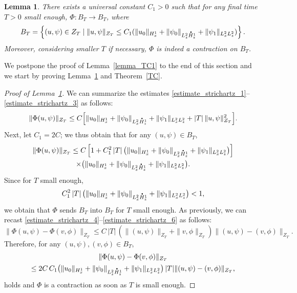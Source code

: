 \documentclass[JEP,XML,SOM,NoEqCountersInSection,NoFloatCountersInSection,Unicode,published]{cedram}
\let\sep\mid
\newtheorem{lemma}{Lemma}[section]
\theoremstyle{definition}
\newcommand*{\overbigdot}[1]{%
\accentset{\mbox{\large\bfseries .}}{#1}}
\newenvironment{ProofOf}[1]{\begin{proof}[Proof of #1]}{\end{proof}}
\begin{document}
\begin{lemma}\label{lemma_TC2}
There exists a universal constant $C_{1}>0$ such that for any final time $T>0$ small enough, $\Phi:B_{T}\to B_{T}$, where
\[
B_{T}=\left\{(u,\psi)\in Z_{T}\sep \|u,\psi\|_{Z_{T}}\leq C_{1}(\|u_{0}\|_{H_{x}^{1}}+\|\psi_{0}\|_{L_{z}^{2}\overbigdot{H}_{z}^{1}}+\|\psi_{1}\|_{L_{x}^{2}L_{z}^{2}})\right\}.
\]
Moreover, considering smaller $T$ if necessary, $\Phi$ is indeed a contraction on $B_{T}$.
\end{lemma}

We postpone the proof of Lemma~\ref{lemma_TC1} to the end of this section and we start by proving Lemma~\ref{lemma_TC2} and Theorem~\ref{TC}.

\begin{ProofOf}{Lemma~\ref{lemma_TC2}}
We can summarize the estimates \eqref{estimate_strichartz_1}--\eqref{estimate_strichartz_3} as follows:
\[
\|\Phi(u,\psi)\|_{Z_{T}}\leq C\Bigl[\|u_{0}\|_{H_{x}^{1}}+\|\psi_{0}\|_{L_{x}^{2}\overbigdot{H}_{z}^{1}}+\|\psi_{1}\|_{L_{x}^{2}L_{z}^{2}}+|T|\,\|u,\psi\|_{Z_{T}}^{2}\Bigr].
\]
Next, let $C_{1}=2C$; we thus obtain that for any $(u,\psi)\in B_{T}$,
\begin{multline*}
\|\Phi(u,\psi)\|_{Z_{T}}\leq C\left[1+C_{1}^{2}\,|T|\, \bigl(\|u_{0}\|_{H_{x}^{1}}+\|\psi_{0}\|_{L_{x}^{2}\overbigdot{H}_{z}^{1}}+\|\psi_{1}\|_{L_{x}^{2}L_{z}^{2}} \bigr)\right]\\
\times\bigl(\|u_{0}\|_{H_{x}^{1}}+\|\psi_{0}\|_{L_{x}^{2}\overbigdot{H}_{z}^{1}}+\|\psi_{1}\|_{L_{x}^{2}L_{z}^{2}}\bigr).
\end{multline*}
Since for $T$ small enough,
\[
C_{1}^{2}\,|T|\, \bigl(\|u_{0}\|_{H_{x}^{1}}+\|\psi_{0}\|_{L_{x}^{2}\overbigdot{H}_{z}^{1}}+\|\psi_{1}\|_{L_{x}^{2}L_{z}^{2}} \bigr)<1,
\]
we obtain that $\Phi$ sends $B_{T}$ into $B_{T}$ for $T$ small enough. As previously, we can recast \eqref{estimate_strichartz_4}--\eqref{estimate_strichartz_6} as follows:\vspace*{-3pt}
\[
\|\Phi(u,\psi)-\Phi(v,\phi)\|_{Z_{T}}\leq C\,|T|\,\left(\|(u,\psi)\|_{Z_{T}}+\|v,\phi\|_{Z_{T}}\right)\|(u,\psi)-(v,\phi)\|_{Z_{T}}.
\]
Therefore, for any $(u,\psi),(v,\phi)\in B_{T}$,\vspace*{-5pt}
\begin{multline*}
\|\Phi(u,\psi)-\Phi(v,\phi)\|_{Z_{T}}
\\
\leq 2C\,C_{1} \bigl(\|u_{0}\|_{H_{x}^{1}}+\|\psi_{0}\|_{L_{z}^{2}\overbigdot{H}_{z}^{1}}+\|\psi_{1}\|_{L_{x}^{2}L_{z}^{2}} \bigr)\,|T|\|(u,\psi)-(v,\phi)\|_{Z_{T}},
\end{multline*}
holds and $\Phi$ is a contraction as soon as $T$ is small enough.
\end{ProofOf}
\end{document}
